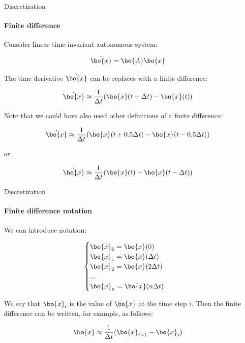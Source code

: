 \documentclass{beamer}
\begin{document}
\begin{frame}{Discretization}
\framesubtitle{Finite difference}
\begin{flushleft}

Consider linear time-invariant autonomous system:

\begin{equation}
    \dot {\bo{x}} = \bo{A} \bo{x}
\end{equation}


The time derivative $\dot {\bo{x}}$ can be replaces with a finite difference:

\begin{equation}
\dot {\bo{x}} \approx \frac{1}{\Delta t}(\bo{x}(t + \Delta t) - \bo{x}(t))
\end{equation}

Note that we could have also used other definitions of a finite difference:

\begin{equation}
\dot {\bo{x}} \approx \frac{1}{\Delta t}(\bo{x}(t + 0.5\Delta t) - \bo{x}(t - 0.5\Delta t))
\end{equation}

or

\begin{equation}
\dot {\bo{x}} \approx \frac{1}{\Delta t}(\bo{x}(t) - \bo{x}(t - \Delta t))
\end{equation}

\end{flushleft}
\end{frame}




\begin{frame}{Discretization}
\framesubtitle{Finite difference notation}
\begin{flushleft}
We can introduce notation:

\begin{equation}
\begin{cases}
\bo{x}_0 = \bo{x}(0) \\
\bo{x}_1 = \bo{x}(\Delta t) \\
\bo{x}_2 = \bo{x}(2\Delta t) \\
... \\
\bo{x}_n = \bo{x}(n\Delta t) 
\end{cases}
\end{equation}

We say that $\bo{x}_i$ is the value of $\bo{x}$ at the time step $i$. Then the finite difference can be written, for example, as follows:

\begin{equation}
\dot {\bo{x}} \approx \frac{1}{\Delta t}(\bo{x}_{i+1} - \bo{x}_i)
\end{equation}

\end{flushleft}
\end{frame}
\end{document}
